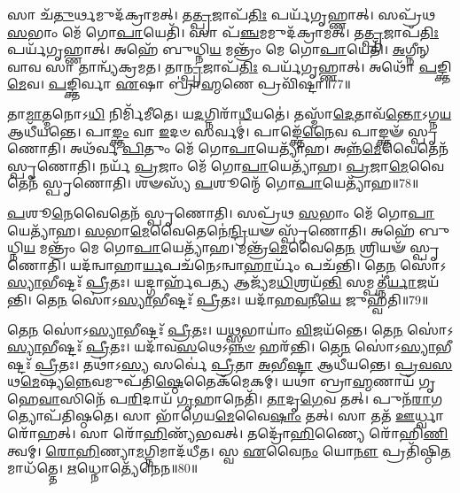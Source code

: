 𑌸𑌾 𑌚᳴\-\ul{𑌤𑍁}\-𑌰𑍍𑌥𑌮𑍁𑌦᳴𑌕𑍍𑌰𑌾𑌮𑌤𑍍।
𑌤\-\ul{𑌤𑍍𑌪𑍍𑌰}\-𑌜𑌾\-𑌪᳴\-\ul{𑌤𑌿𑌃} 𑌪𑌰𑍍𑌯᳴𑌗𑍃𑌹𑍍𑌣𑌾𑌤𑍍।
𑌸𑌪𑍍𑌰᳴𑌥 \ul{𑌸}\-𑌭𑌾𑌂 𑌮𑍇᳴ 𑌗𑍋\-\ul{𑌪𑌾}\-𑌯𑍇𑌤𑌿᳴।
𑌸𑌾 𑌪᳴\-\ul{𑌞𑍍𑌚}\-𑌮𑌮𑍁𑌦᳴𑌕𑍍𑌰𑌾𑌮𑌤𑍍।
𑌤\-\ul{𑌤𑍍𑌪𑍍𑌰}\-𑌜𑌾\-𑌪᳴\-\ul{𑌤𑌿𑌃} 𑌪𑌰𑍍𑌯᳴𑌗𑍃𑌹𑍍𑌣𑌾𑌤𑍍।
𑌅𑌹𑍇᳴ 𑌬𑍁𑌧𑍍𑌨𑌿\-\ul{𑌯} 𑌮𑌨𑍍𑌤𑍍𑌰𑌂᳴ 𑌮𑍇 𑌗𑍋\-\ul{𑌪𑌾}\-𑌯𑍇𑌤𑌿᳴।
\-\ul{𑌅}\-𑌗𑍍𑌨𑍀𑌨𑍍 𑌵𑌾𑌵 𑌸𑌾 𑌤𑌾𑌨𑍍𑌵𑍍𑌯᳴𑌕𑍍𑌰𑌮𑌤।
𑌤𑌾\-\ul{𑌨𑍍𑌪𑍍𑌰}\-𑌜𑌾\-𑌪᳴\-\ul{𑌤𑌿𑌃} 𑌪𑌰𑍍𑌯᳴𑌗𑍃𑌹𑍍𑌣𑌾𑌤𑍍।
𑌅𑌥𑍋᳴ \ul{𑌪}\-𑌙𑍍𑌕𑍍𑌤𑌿\-\ul{𑌮𑍇}\-𑌵।
\-\ul{𑌪}\-𑌙𑍍𑌕𑍍𑌤𑌿𑌰𑍍𑌵𑌾 \ul{𑌏}\-𑌷𑌾 𑌬𑍍𑌰𑌾॑\-\ul{𑌹𑍍𑌮}\-𑌣𑍇 𑌪𑍍𑌰𑌵𑌿᳴𑌷𑍍𑌟𑌾॥77॥

𑌤𑌾\-\ul{𑌮𑌾}\-𑌤𑍍𑌮𑌨𑍋𑌽\-\ul{𑌧𑌿} 𑌨𑌿𑌰𑍍𑌮𑌿᳴𑌮𑍀𑌤𑍇।
𑌯\-\ul{𑌦}\-𑌗𑍍𑌨𑌿𑌰𑌾᳴\-\ul{𑌧𑍀}\-𑌯𑌤𑍇॑।
𑌤𑌸𑍍𑌮𑌾᳴\-\ul{𑌦𑍇}\-𑌤𑌾𑌵᳴\-\ul{𑌨𑍍𑌤𑍋}\-\-𑌽𑌗𑍍𑌨\-\ul{𑌯} 𑌆𑌧𑍀᳴𑌯𑌨𑍍𑌤𑍇।
𑌪𑌾\-\ul{𑌙𑍍𑌕𑍍𑌤𑌂} 𑌵𑌾 \ul{𑌇}\-𑌦𑍞 𑌸𑌰𑍍𑌵𑌮𑍍॑।
𑌪𑌾𑌙𑍍𑌕𑍍𑌤𑍇᳴\-\ul{𑌨𑍈}\-𑌵 𑌪𑌾𑌙𑍍𑌕𑍍𑌤𑍟᳴ 𑌸𑍍𑌪𑍃𑌣𑍋𑌤𑌿।
𑌅𑌥᳴𑌰𑍍𑌵 \ul{𑌪𑌿}\-𑌤𑍁𑌂 𑌮𑍇᳴ 𑌗𑍋\-\ul{𑌪𑌾}\-𑌯𑍇𑌤𑍍𑌯𑌾᳴𑌹।
𑌅𑌨𑍍𑌨᳴\-\ul{𑌮𑍇}\-𑌵𑍈𑌤𑍇𑌨᳴ 𑌸𑍍𑌪𑍃𑌣𑍋𑌤𑌿।
𑌨𑌰𑍍𑌯᳴ \ul{𑌪𑍍𑌰}\-𑌜𑌾𑌂 𑌮𑍇᳴ 𑌗𑍋\-\ul{𑌪𑌾}\-𑌯𑍇𑌤𑍍𑌯𑌾᳴𑌹।
\-\ul{𑌪𑍍𑌰}\-𑌜𑌾\-\ul{𑌮𑍇}\-𑌵𑍈𑌤𑍇𑌨᳴ 𑌸𑍍𑌪𑍃𑌣𑍋𑌤𑌿।
𑌶𑍟𑌸𑍍𑌯᳴ \ul{𑌪}\-𑌶𑍂𑌨𑍍𑌮𑍇᳴ 𑌗𑍋\-\ul{𑌪𑌾}\-𑌯𑍇𑌤𑍍𑌯𑌾᳴𑌹॥78॥

\-\ul{𑌪}\-𑌶𑍂\-\ul{𑌨𑍇}\-𑌵𑍈𑌤𑍇𑌨᳴ 𑌸𑍍𑌪𑍃𑌣𑍋𑌤𑌿।
𑌸𑌪𑍍𑌰᳴𑌥 \ul{𑌸}\-𑌭𑌾𑌂 𑌮𑍇᳴ 𑌗𑍋\-\ul{𑌪𑌾}\-𑌯𑍇𑌤𑍍𑌯𑌾᳴𑌹।
\-\ul{𑌸}\-𑌭𑌾\-\ul{𑌮𑍇}\-𑌵𑍈𑌤𑍇𑌨𑍇॑\-\ul{𑌨𑍍𑌦𑍍𑌰𑌿}\-𑌯𑍟 𑌸𑍍𑌪𑍃᳴𑌣𑍋𑌤𑌿।
𑌅𑌹𑍇᳴ 𑌬𑍁𑌧𑍍𑌨𑌿\-\ul{𑌯} 𑌮𑌨𑍍𑌤𑍍𑌰𑌂᳴ 𑌮𑍇 𑌗𑍋\-\ul{𑌪𑌾}\-𑌯𑍇𑌤𑍍𑌯𑌾᳴𑌹।
𑌮𑌨𑍍𑌤𑍍𑌰᳴\-\ul{𑌮𑍇}\-𑌵𑍈𑌤𑍇\-\ul{𑌨} 𑌶𑍍𑌰𑌿𑌯𑍟᳴ 𑌸𑍍𑌪𑍃𑌣𑍋𑌤𑌿।
𑌯𑌦᳴𑌨𑍍𑌵𑌾𑌹𑌾\-\ul{𑌰𑍍𑌯}\-𑌪𑌚᳴𑌨𑍇\-𑌽𑌨𑍍𑌵𑌾\-\ul{𑌹𑌾}\-𑌰𑍍𑌯𑌂᳴ 𑌪𑌚᳴𑌨𑍍𑌤𑌿।
𑌤𑍇\-\ul{𑌨} 𑌸𑍋॑\-𑌽\-\ul{𑌸𑍍𑌯𑌾}\-𑌭𑍀𑌷𑍍𑌟𑌃᳴ \ul{𑌪𑍍𑌰𑍀}\-𑌤𑌃।
𑌯𑌦𑍍𑌗𑌾𑌰𑍍\mbox{}𑌹᳴𑌪\-\ul{𑌤𑍍𑌯} 𑌆𑌜𑍍𑌯᳴𑌮\-\ul{𑌧𑌿}\-𑌶𑍍𑌰𑌯᳴\-\ul{𑌨𑍍𑌤𑌿} 𑌸𑌮𑍍𑌪𑌤𑍍𑌨𑍀॑\-\ul{𑌰𑍍𑌯𑌾}\-𑌜𑌯᳴𑌨𑍍𑌤𑌿।
𑌤𑍇\-\ul{𑌨} 𑌸𑍋॑\-𑌽\-\ul{𑌸𑍍𑌯𑌾}\-𑌭𑍀𑌷𑍍𑌟𑌃᳴ \ul{𑌪𑍍𑌰𑍀}\-𑌤𑌃।
𑌯𑌦𑌾᳴𑌹\-\ul{𑌵}\-𑌨𑍀\-\ul{𑌯𑍇} 𑌜𑍁𑌹𑍍𑌵᳴𑌤𑌿॥79॥

𑌤𑍇\-\ul{𑌨} 𑌸𑍋॑\-𑌽\-\ul{𑌸𑍍𑌯𑌾}\-𑌭𑍀𑌷𑍍𑌟𑌃᳴ \ul{𑌪𑍍𑌰𑍀}\-𑌤𑌃।
𑌯\-\ul{𑌥𑍍𑌸}\-𑌭𑌾𑌯𑌾𑌂॑ \ul{𑌵𑌿}\-𑌜𑌯᳴𑌨𑍍𑌤𑍇।
𑌤𑍇\-\ul{𑌨} 𑌸𑍋॑\-𑌽\-\ul{𑌸𑍍𑌯𑌾}\-𑌭𑍀𑌷𑍍𑌟𑌃᳴ \ul{𑌪𑍍𑌰𑍀}\-𑌤𑌃।
𑌯𑌦𑌾᳴𑌵\-\ul{𑌸}\-𑌥𑍇\-𑌽\-\ul{𑌨𑍍𑌨}\-\-\ul{𑍞} 𑌹𑌰᳴𑌨𑍍𑌤𑌿।
𑌤𑍇\-\ul{𑌨} 𑌸𑍋॑\-𑌽\-\ul{𑌸𑍍𑌯𑌾}\-𑌭𑍀𑌷𑍍𑌟𑌃᳴ \ul{𑌪𑍍𑌰𑍀}\-𑌤𑌃।
𑌤𑌥𑌾॑𑌽\-\ul{𑌸𑍍𑌯} 𑌸𑌰𑍍𑌵𑍇॑ \ul{𑌪𑍍𑌰𑍀}\-𑌤𑌾 \ul{𑌅}\-𑌭𑍀\-\ul{𑌷𑍍𑌟𑌾} 𑌆𑌧𑍀᳴𑌯𑌨𑍍𑌤𑍇।
\-\ul{𑌪𑍍𑌰}\-\-\ul{𑌵}\-\-\ul{𑌸}\-𑌥\-\ul{𑌮𑍇}\-𑌷𑍍𑌯\-\ul{𑌨𑍍𑌨𑍇}\-𑌵𑌮𑍁𑌪᳴𑌤𑌿\-\ul{𑌷𑍍𑌠𑍇}\-𑌤𑍈𑌕᳴𑌮𑍇𑌕𑌮𑍍।
𑌯𑌥𑌾॑ 𑌬𑍍𑌰𑌾\-\ul{𑌹𑍍𑌮}\-𑌣𑌾𑌯᳴ 𑌗𑍃𑌹𑍇\-\ul{𑌵𑌾}\-𑌸𑌿𑌨𑍇᳴ 𑌪\-\ul{𑌰𑌿}\-𑌦𑌾𑌯᳴ \ul{𑌗𑍃}\-𑌹𑌾𑌨𑍇𑌤𑌿᳴।
\-\ul{𑌤𑌾}\-𑌦𑍃\-\ul{𑌗𑍇}\-𑌵 𑌤𑌤𑍍।
𑌪𑍁𑌨᳴\-\ul{𑌰𑌾}\-𑌗𑌤𑍍𑌯𑍋𑌪᳴𑌤𑌿𑌷𑍍𑌠𑌤𑍇।
𑌸𑌾 𑌭𑌾᳴𑌗𑍇𑌯\-\ul{𑌮𑍇}\-𑌵𑍈\-\ul{𑌷𑌾𑌂} 𑌤𑌤𑍍।
𑌸𑌾 𑌤𑌤᳴ \ul{𑌊}\-𑌰𑍍𑌧𑍍𑌵𑌾𑌰𑍋᳴𑌹𑌤𑍍।
𑌸𑌾 𑌰𑍋᳴\-\ul{𑌹𑌿}\-𑌣𑍍𑌯᳴𑌭𑌵𑌤𑍍।
𑌤𑌦𑍍𑌰𑍋᳴\-\ul{𑌹𑌿}\-𑌣𑍍𑌯𑍈 𑌰𑍋᳴𑌹𑌿\-\ul{𑌣𑌿}\-𑌤𑍍𑌵𑌮𑍍।
\-\ul{𑌰𑍋}\-\-\ul{𑌹𑌿}\-𑌣𑍍𑌯𑌾\-\ul{𑌮}\-𑌗𑍍𑌨𑌿𑌮𑌾𑌦᳴𑌧𑍀𑌤।
𑌸𑍍𑌵 \ul{𑌏}\-𑌵𑍈\-\ul{𑌨𑌂} 𑌯𑍋\-\ul{𑌨𑍗} 𑌪𑍍𑌰𑌤𑌿᳴\-𑌷𑍍𑌠𑌿\-\ul{𑌤}\-𑌮𑌾𑌧᳴𑌤𑍍𑌤𑍇।
\-\ul{𑌋}\-𑌧𑍍𑌨𑍋𑌤𑍍𑌯𑍇᳴𑌨𑍇𑌨॥80॥\anuvakamend[\-\ul{𑌏}\-𑌷𑌾 \ul{𑌪}\-𑌶𑍂𑌨𑍍𑌮𑍇᳴ 𑌗𑍋\-\ul{𑌪𑌾}\-𑌯𑍇\-\ul{𑌤𑌿} 𑌪𑍍𑌰𑌵𑌿᳴𑌷𑍍𑌟𑌾 \ul{𑌪}\-𑌶𑍂𑌨𑍍𑌮𑍇᳴ 𑌗𑍋\-\ul{𑌪𑌾}\-𑌯𑍇𑌤𑍍𑌯𑌾᳴\-\ul{𑌹} 𑌜𑍁𑌹𑍍𑌵᳴𑌤𑌿 𑌤𑌿𑌷𑍍𑌠𑌤𑍇 \ul{𑌸}\-𑌪𑍍𑌤 𑌚᳴]





